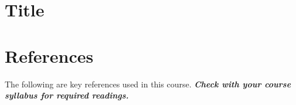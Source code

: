 \documentclass[
]{book}
\begin{document}
\hypertarget{title}{%
\chapter{Title}\label{title}}

\hypertarget{references}{%
\chapter*{References}\label{references}}

The following are key references used in this course. \textbf{\emph{Check with your course syllabus for required readings.}}

  
\end{document}

